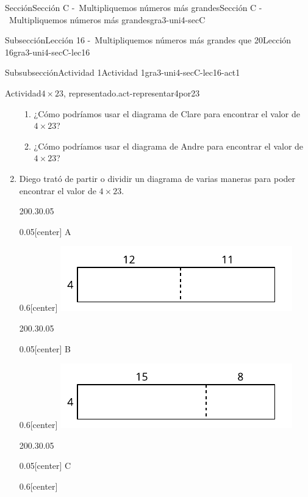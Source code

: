 \documentclass[twoside,10pt,]{article}
\begin{document}
\begin{sectionptx}{Sección}{Sección C -~Multipliquemos números más grandes}{}{Sección C -~Multipliquemos números más grandes}{}{}{gra3-uni4-secC}
\begin{subsectionptx}{Subsección}{Lección 16 -~Multipliquemos números más grandes que 20}{}{Lección 16}{}{}{gra3-uni4-secC-lec16}
\begin{subsubsectionptx}{Subsubsección}{Actividad 1}{}{Actividad 1}{}{}{gra3-uni4-secC-lec16-act1}
\begin{activity}{Actividad}{\(4\times 23\), representado.}{act-representar4por23}
\begin{enumerate}
\begin{enumerate}
\item{}¿Cómo podríamos usar el diagrama de Clare para encontrar el valor de \(4\times 23\)?%
\item{}¿Cómo podríamos usar el diagrama de Andre para encontrar el valor de \(4\times 23\)?%
\end{enumerate}
\item{}Diego trató de partir o dividir un diagrama de varias maneras para poder encontrar el valor de \(4\times 23\).%
\begin{sidebyside}{2}{0}{0.3}{0.05}%
\begin{sbspanel}{0.05}[center]%
A%
\end{sbspanel}%
\begin{sbspanel}{0.6}[center]%
\includegraphics[width=\linewidth]{external/svg-source/tikz-file-152971.pdf}
\end{sbspanel}%
\end{sidebyside}%
\begin{sidebyside}{2}{0}{0.3}{0.05}%
\begin{sbspanel}{0.05}[center]%
B%
\end{sbspanel}%
\begin{sbspanel}{0.6}[center]%
\includegraphics[width=\linewidth]{external/svg-source/tikz-file-152972.pdf}
\end{sbspanel}%
\end{sidebyside}%
\begin{sidebyside}{2}{0}{0.3}{0.05}%
\begin{sbspanel}{0.05}[center]%
C%
\end{sbspanel}%
\begin{sbspanel}{0.6}[center]%

\end{sbspanel}
\end{sidebyside}
\end{enumerate}
\end{activity}
\end{subsubsectionptx}
\end{subsectionptx}
\end{sectionptx}
\end{document}
